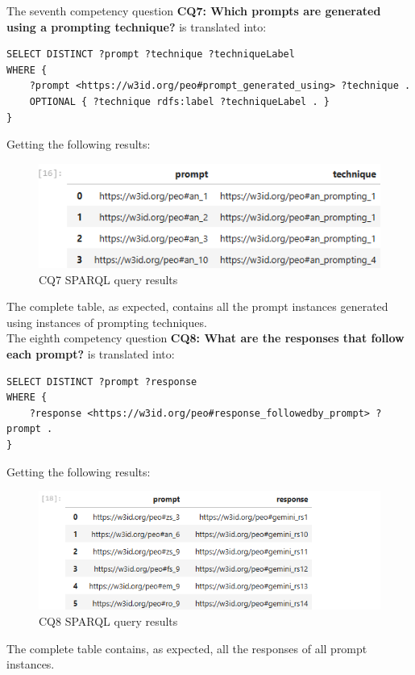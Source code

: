 The seventh competency question \textbf{CQ7: Which prompts are generated using a prompting technique?} is translated into:
\begin{lstlisting}
SELECT DISTINCT ?prompt ?technique ?techniqueLabel
WHERE {
    ?prompt <https://w3id.org/peo#prompt_generated_using> ?technique .
    OPTIONAL { ?technique rdfs:label ?techniqueLabel . }
}
\end{lstlisting}
Getting the following results:
\begin{figure}[H]
    \centering
    \includegraphics[width=0.9\linewidth]{Figures/fig_53.png}
    \caption{CQ7 SPARQL query results}
    \label{fig:enter-label}
\end{figure}
The complete table, as expected, contains all the prompt instances generated using instances of prompting techniques.\\

The eighth competency question \textbf{CQ8: What are the responses that follow each prompt?} is translated into:
\begin{lstlisting}
SELECT DISTINCT ?prompt ?response
WHERE {
    ?response <https://w3id.org/peo#response_followedby_prompt> ?prompt .
}    
\end{lstlisting}
Getting the following results:
\begin{figure}[H]
    \centering
    \includegraphics[width=0.9\linewidth]{Figures/fig_54.png}
    \caption{CQ8 SPARQL query results}
    \label{fig:enter-label}
\end{figure}
The complete table contains, as expected, all the responses of all prompt instances.\\

